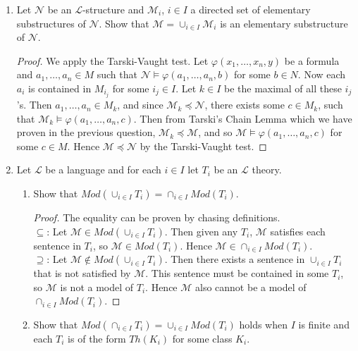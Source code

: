 \documentclass{article}
\begin{document}
\begin{enumerate}
  \item Let $\mathcal{N}$ be an $\mathcal{L}$-structure and
    $\mathcal{M}_i$, $i\in I$ a directed set of elementary substructures of
    $\mathcal{N}$. Show that $\mathcal{M}=\cup_{i\in I}\mathcal{M}_i$ is an
    elementary substructure of $\mathcal{N}$.

    \begin{proof}
      We apply the Tarski-Vaught test. Let $\varphi(x_1,\ldots,x_n,y)$ be a
      formula and $a_1,\ldots,a_n\in M$ such that
      $\mathcal{N}\models\varphi(a_1,\ldots,a_n,b)$ for some $b\in N$. Now
      each $a_i$ is contained in $M_{i_j}$ for some $i_j\in I$. Let $k\in
      I$ be the maximal of all these $i_j$'s. Then $a_1,\ldots,a_n\in M_k$,
      and since $\mathcal{M}_k\preceq\mathcal{N}$, there exists some $c\in
      M_k$, such that $\mathcal{M}_k\models\varphi(a_1,\ldots,a_n,c)$. Then
      from Tarski's Chain Lemma which we have proven in the previous
      question, $\mathcal{M}_k\preceq\mathcal{M}$, and so
      $\mathcal{M}\models\varphi(a_1,\ldots,a_n,c)$ for some $c\in M$. Hence
      $\mathcal{M}\preceq\mathcal{N}$ by the Tarski-Vaught test.
    \end{proof}

  \item Let $\mathcal{L}$ be a language and for each $i\in I$ let $T_i$ be
    an $\mathcal{L}$ theory.
    \begin{enumerate}
      \item Show that $Mod(\cup_{i\in I}T_i)=\cap_{i\in I}Mod(T_i)$.
        \begin{proof}
          The equality can be proven by chasing definitions. \\

          $\subseteq$: Let $\mathcal{M}\in Mod(\cup_{i\in I}T_i)$. Then
          given any $T_i$, $\mathcal{M}$ satisfies each sentence in $T_i$,
          so $\mathcal{M}\in Mod(T_i)$. Hence $\mathcal{M}\in \cap_{i\in
          I}Mod(T_i)$. \\

          $\supseteq$: Let $\mathcal{M}\not\in Mod(\cup_{i\in I}T_i)$.
          Then there exists a sentence in $\cup_{i\in I}T_i$ that is
          not satisfied by $\mathcal{M}$. This sentence must be contained
          in some $T_i$, so $\mathcal{M}$ is not a model of $T_i$. Hence
          $\mathcal{M}$ also cannot be a model of $\cap_{i\in I}Mod(T_i)$.
        \end{proof}

      \item Show that $Mod(\cap_{i\in I}T_i)=\cup_{i\in I}Mod(T_i)$ holds
        when $I$ is finite and each $T_i$ is of the form $Th(K_i)$ for some
        class $K_i$.


\end{enumerate}
\end{enumerate}
\end{document}
